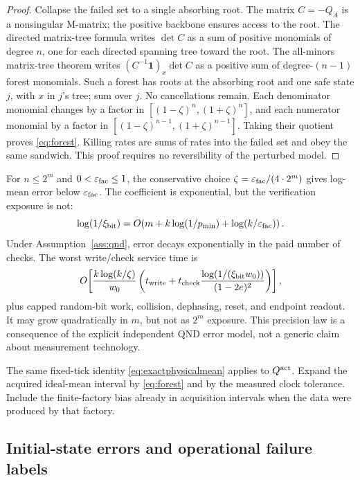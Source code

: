 \documentclass[10pt,a4paper]{article}
\theoremstyle{definition}\newtheorem{assumption}[theorem]{Assumption}
\newcommand{\one}{\mathbf 1}
\newcommand{\eps}{\varepsilon}
\begin{document}
\begin{proof}
Collapse the failed set to a single absorbing root. The matrix $C=-Q_A$ is a nonsingular M-matrix; the positive backbone ensures access to the root. The directed matrix-tree formula writes $\det C$ as a sum of positive monomials of degree $n$, one for each directed spanning tree toward the root. The all-minors matrix-tree theorem \cite{chaiken} writes
$(C^{-1}\one)_x\det C$ as a positive sum of degree-$(n-1)$ forest monomials. Such a forest has roots at the absorbing root and one safe state $j$, with $x$ in $j$'s tree; sum over $j$. No cancellations remain. Each denominator monomial changes by a factor in $[(1-\zeta)^n,(1+\zeta)^n]$, and each numerator monomial by a factor in $[(1-\zeta)^{n-1},(1+\zeta)^{n-1}]$. Taking their quotient proves \eqref{eq:forest}. Killing rates are sums of rates into the failed set and obey the same sandwich. This proof requires no reversibility of the perturbed model.
\end{proof}

For $n\le2^m$ and $0<\eps_{\rm fac}\le1$, the conservative choice
$\zeta=\eps_{\rm fac}/(4\cdot2^m)$ gives log-mean error below $\eps_{\rm fac}$. The coefficient is exponential, but the verification exposure is not:
\begin{equation}
 \log(1/\xi_{\rm bit})
 =O\!\left(m+k\log(1/p_{\min})+\log(k/\eps_{\rm fac})\right).
 \label{eq:precisioncost}
\end{equation}
Under Assumption~\ref{ass:qnd}, error decays exponentially in the paid number of checks. The worst write/check service time is
\begin{equation}
 O\!\left[
 \frac{k\log(k/\zeta)}{w_0}
 \left(t_{\rm write}
  +t_{\rm check}\frac{\log(1/(\xi_{\rm bit}w_0))}{(1-2e)^2}\right)
 \right],
 \label{eq:servicetime}
\end{equation}
plus capped random-bit work, collision, dephasing, reset, and endpoint readout. It may grow quadratically in $m$, but not as $2^m$ exposure. This precision law is a consequence of the explicit independent QND error model, not a generic claim about measurement technology.

The same fixed-tick identity \eqref{eq:exactphysicalmean} applies to $Q^{\rm act}$. Expand the acquired ideal-mean interval by \eqref{eq:forest} and by the measured clock tolerance. Include the finite-factory bias already in acquisition intervals when the data were produced by that factory.

\subsection{Initial-state errors and operational failure labels}
\end{document}

